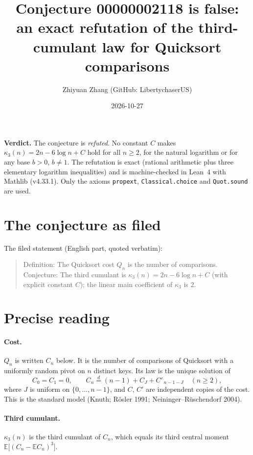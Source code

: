 \documentclass[11pt]{article}
\title{Conjecture 00000002118 is false: \\
an exact refutation of the third-cumulant law for Quicksort comparisons}
\author{Zhiyuan Zhang (GitHub: LibertychaserUS)}
\date{2026-10-27}
\theoremstyle{definition}
\theoremstyle{plain}
\begin{document}
\maketitle

\noindent\textbf{Verdict.} The conjecture is \emph{refuted}. No constant $C$ makes
$\kappa_3(n)=2n-6\log n+C$ hold for all $n\ge 2$, for the natural logarithm or for any base $b>0$, $b\ne 1$.
The refutation is exact (rational arithmetic plus three elementary logarithm inequalities) and is
machine-checked in Lean~4 with Mathlib (v4.33.1). Only the axioms \texttt{propext}, \texttt{Classical.choice}
and \texttt{Quot.sound} are used.

\section{The conjecture as filed}

The filed statement (English part, quoted verbatim):

\begin{quote}
Definition: The Quicksort cost $Q_n$ is the number of comparisons. Conjecture: The third cumulant is
$\kappa_3(n) = 2n - 6\log n + C$ (with explicit constant $C$); the linear main coefficient of $\kappa_3$ is $2$.
\end{quote}

\section{Precise reading}

\paragraph{Cost.} $Q_n$ is written $C_n$ below. It is the number of comparisons of Quicksort with a uniformly random
pivot on $n$ distinct keys. Its law is the unique solution of
\[
  C_0 = C_1 = 0, \qquad C_n \overset{d}{=} (n-1) + C_J + C'_{\,n-1-J}\quad (n\ge 2),
\]
where $J$ is uniform on $\{0,\dots,n-1\}$, and $C$, $C'$ are independent copies of the cost. This is the standard
model (Knuth; R\"osler 1991; Neininger--R\"uschendorf 2004).

\paragraph{Third cumulant.} $\kappa_3(n)$ is the third cumulant of $C_n$, which equals its third central moment
$\mathbb{E}\big[(C_n-\mathbb{E}C_n)^3\big]$.
\end{document}
